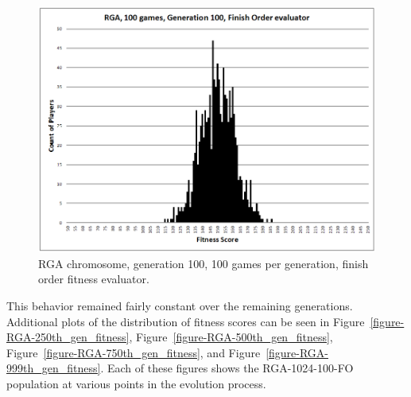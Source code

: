 \begin{figure}[htp]
\centerline{\includegraphics[width=0.75\columnwidth]{Figures/RGA_1024_G100_N100_FO.png}}
\caption[RGA Fitness Distribution, 100th Generation]{RGA chromosome, generation
100, 100 games per generation, finish order fitness evaluator.}
\label{figure-100th_gen_fitness}
\end{figure}

This behavior remained fairly constant over the remaining generations.
Additional plots of the distribution of fitness scores can be seen in
Figure~\ref{figure-RGA-250th_gen_fitness},
Figure~\ref{figure-RGA-500th_gen_fitness},
Figure~\ref{figure-RGA-750th_gen_fitness}, and
Figure~\ref{figure-RGA-999th_gen_fitness}. Each of these figures shows the
RGA-1024-100-FO population at various points in the evolution process.

